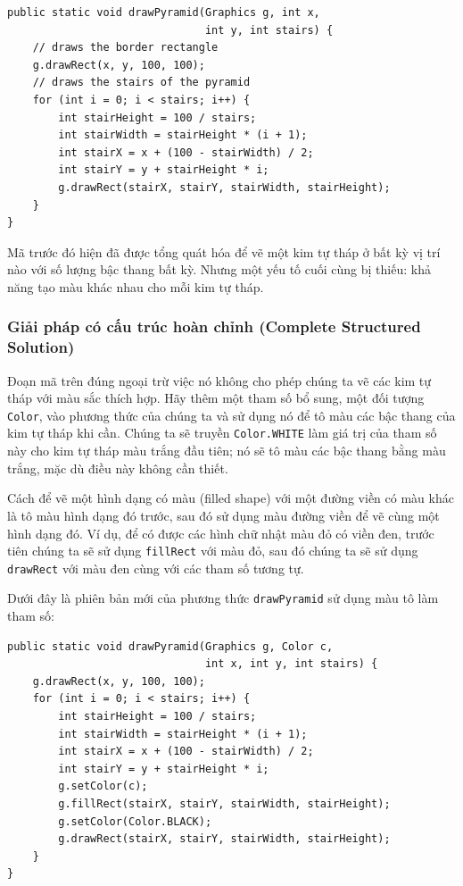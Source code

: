 \begin{verbatim}
public static void drawPyramid(Graphics g, int x,
                               int y, int stairs) {
    // draws the border rectangle
    g.drawRect(x, y, 100, 100);
    // draws the stairs of the pyramid
    for (int i = 0; i < stairs; i++) {
        int stairHeight = 100 / stairs;
        int stairWidth = stairHeight * (i + 1);
        int stairX = x + (100 - stairWidth) / 2;
        int stairY = y + stairHeight * i;
        g.drawRect(stairX, stairY, stairWidth, stairHeight);
    }
}
\end{verbatim}

Mã trước đó hiện đã được tổng quát hóa để vẽ một kim tự tháp ở bất kỳ vị
trí nào với số lượng bậc thang bất kỳ. Nhưng một yếu tố cuối cùng bị
thiếu: khả năng tạo màu khác nhau cho mỗi kim tự tháp.

\subsubsection{Giải pháp có cấu trúc hoàn chỉnh (Complete Structured
Solution)}\label{giux1ea3i-phuxe1p-cuxf3-cux1ea5u-truxfac-houxe0n-chux1ec9nh-complete-structured-solution}

Đoạn mã trên đúng ngoại trừ việc nó không cho phép chúng ta vẽ các kim
tự tháp với màu sắc thích hợp. Hãy thêm một tham số bổ sung, một đối
tượng \texttt{Color}, vào phương thức của chúng ta và sử dụng nó để tô
màu các bậc thang của kim tự tháp khi cần. Chúng ta sẽ truyền
\texttt{Color.WHITE} làm giá trị của tham số này cho kim tự tháp màu
trắng đầu tiên; nó sẽ tô màu các bậc thang bằng màu trắng, mặc dù điều
này không cần thiết.

Cách để vẽ một hình dạng có màu (filled shape) với một đường viền có màu
khác là tô màu hình dạng đó trước, sau đó sử dụng màu đường viền để vẽ
cùng một hình dạng đó. Ví dụ, để có được các hình chữ nhật màu đỏ có
viền đen, trước tiên chúng ta sẽ sử dụng \texttt{fillRect} với màu đỏ,
sau đó chúng ta sẽ sử dụng \texttt{drawRect} với màu đen cùng với các
tham số tương tự.

Dưới đây là phiên bản mới của phương thức \texttt{drawPyramid} sử dụng
màu tô làm tham số:

\begin{verbatim}
public static void drawPyramid(Graphics g, Color c,
                               int x, int y, int stairs) {
    g.drawRect(x, y, 100, 100);
    for (int i = 0; i < stairs; i++) {
        int stairHeight = 100 / stairs;
        int stairWidth = stairHeight * (i + 1);
        int stairX = x + (100 - stairWidth) / 2;
        int stairY = y + stairHeight * i;
        g.setColor(c);
        g.fillRect(stairX, stairY, stairWidth, stairHeight);
        g.setColor(Color.BLACK);
        g.drawRect(stairX, stairY, stairWidth, stairHeight);
    }
}
\end{verbatim}

